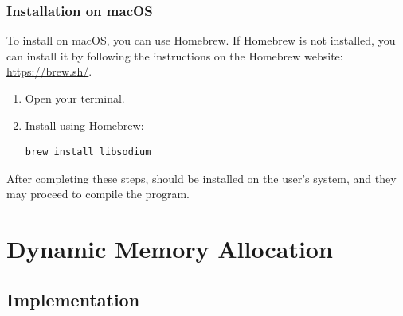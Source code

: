 \documentclass[12pt]{article}
\begin{document}
\subsubsection{ Installation on macOS}

To install  on macOS, you can use Homebrew. If Homebrew is not installed, you can install it by following the instructions on the Homebrew website: \url{https://brew.sh/}.

\begin{enumerate}
    \item Open your terminal.
    \item Install  using Homebrew:
 	\begin{mdframed}[style=myboxstyleTerminal1]
		\begin{verbatim}
brew install libsodium
		\end{verbatim}
	\end{mdframed}
\end{enumerate}

After completing these steps,  should be installed on the user's system, and they may proceed to compile the program.

\section{Dynamic Memory Allocation}

\subsection{Implementation}
\end{document}

